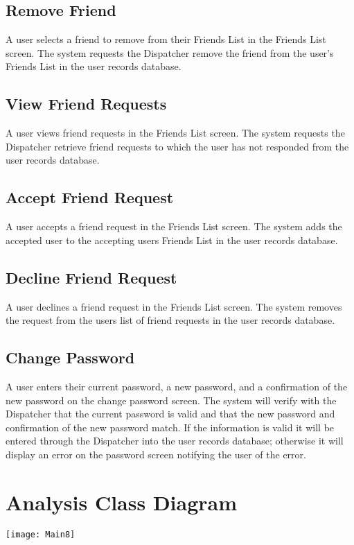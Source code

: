 \documentclass[english]{article}
\begin{document}
\subsection{Remove Friend}
A user selects a friend to remove from their Friends List in the Friends List screen. The system requests the Dispatcher remove the friend from the user's Friends List in the user records database.  
\subsection{View Friend Requests}
A user views friend requests in the Friends List screen. The system requests the Dispatcher retrieve friend requests to which the user has not responded from the user records database.
\subsection{Accept Friend Request}
A user accepts a friend request in the Friends List screen. The system adds the accepted user to the accepting users Friends List in the user records database. 
\subsection{Decline Friend Request}
A user declines a friend request in the Friends List screen. The system removes the request from the users list of friend requests in the user records database.
\subsection{Change Password}
A user enters their current password, a new password, and a confirmation of the new password on the change password screen. The system will verify with the Dispatcher that the current password is valid and that the new password and confirmation of the new password match. If the information is valid it will be entered through the Dispatcher into the user records database; otherwise it will display an error on the password screen notifying the user of the error. 




\section{Analysis Class Diagram}
\label{sec:analysis_class_diagram}
\texttt{[image: Main8]}
\end{document}
